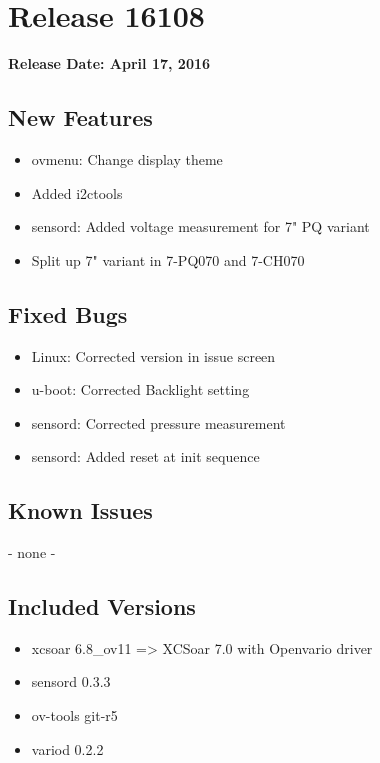 \chapter*{Release 16108}

\begin{flushleft}
	\textbf{Release Date: April 17, 2016}
\end{flushleft}

\section*{New Features}

\begin{itemize}
	\item ovmenu: Change display theme
	\item Added i2ctools
	\item sensord: Added voltage measurement for 7" PQ variant
	\item Split up 7" variant in 7-PQ070 and 7-CH070
\end{itemize}

\section*{Fixed Bugs}
\begin{itemize}
	\item Linux: Corrected version in issue screen
	\item u-boot: Corrected Backlight setting
	\item sensord: Corrected pressure measurement
	\item sensord: Added reset at init sequence
\end{itemize}

\section*{Known Issues}
	- none -

\section*{Included Versions}

\begin{itemize}
	\item xcsoar 6.8\_ov11 => XCSoar 7.0 with Openvario driver
	\item sensord 0.3.3
	\item ov-tools git-r5
	\item variod 0.2.2
\end{itemize}